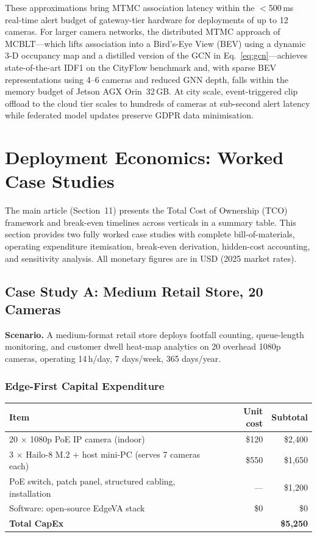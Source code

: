 \documentclass[11pt,a4paper]{article}
\begin{document}
These approximations bring MTMC association latency within the
$<$500\,ms real-time alert budget of gateway-tier hardware for
deployments of up to 12 cameras. For larger camera networks,
the distributed MTMC approach of MCBLT---which lifts association
into a Bird's-Eye View (BEV) using a dynamic 3-D occupancy map
and a distilled version of the GCN in Eq.~\ref{eq:gcn}---achieves
state-of-the-art IDF1 on the CityFlow benchmark and, with sparse BEV
representations using 4--6 cameras and reduced GNN depth, falls
within the memory budget of Jetson AGX Orin~32\,GB. At city scale,
event-triggered clip offload to the cloud tier scales to hundreds
of cameras at sub-second alert latency while federated model updates
preserve GDPR data minimisation.

\section{Deployment Economics: Worked Case Studies}
\label{sec:econ_cases}

\noindent The main article (Section~11) presents the Total Cost of
Ownership (TCO) framework and break-even timelines across verticals
in a summary table. This section provides two fully worked case
studies with complete bill-of-materials, operating expenditure
itemisation, break-even derivation, hidden-cost accounting, and
sensitivity analysis. All monetary figures are in USD (2025 market
rates).

\subsection{Case Study A: Medium Retail Store, 20 Cameras}
\label{ssec:case_a}

\textbf{Scenario.} A medium-format retail store deploys footfall
counting, queue-length monitoring, and customer dwell heat-map
analytics on 20 overhead 1080p cameras, operating 14\,h/day,
7 days/week, 365 days/year.

\subsubsection*{Edge-First Capital Expenditure}

\begin{center}
\begin{tabular}{lrr}
  \toprule
  \textbf{Item} & \textbf{Unit cost} & \textbf{Subtotal} \\
  \midrule
  20 $\times$ 1080p PoE IP camera (indoor) & \$120 & \$2,400 \\
  3 $\times$ Hailo-8 M.2 + host mini-PC (serves 7 cameras each) & \$550 & \$1,650 \\
  PoE switch, patch panel, structured cabling, installation & --- & \$1,200 \\
  Software: open-source EdgeVA stack & \$0 & \$0 \\
  \midrule
  \textbf{Total CapEx} & & \textbf{\$5,250} \\
  \bottomrule
\end{tabular}
\end{center}
\end{document}
